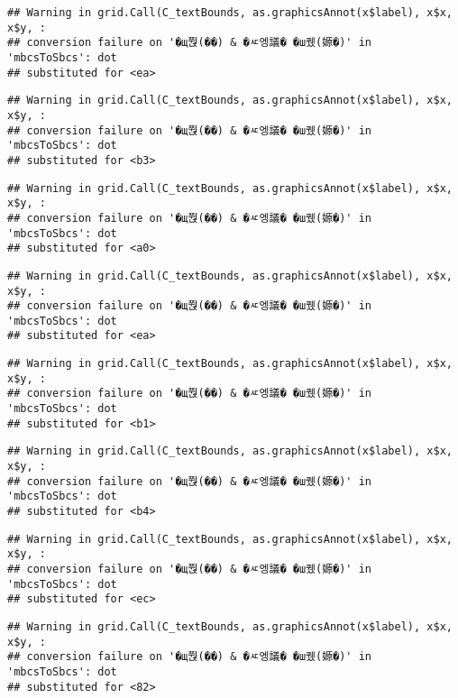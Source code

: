 \documentclass[
]{article}
\begin{document}
\begin{verbatim}
## Warning in grid.Call(C_textBounds, as.graphicsAnnot(x$label), x$x, x$y, :
## conversion failure on '�щ쭩(��) & �ㅼ엥議� �ш퀬(嫄�)' in 'mbcsToSbcs': dot
## substituted for <ea>
\end{verbatim}

\begin{verbatim}
## Warning in grid.Call(C_textBounds, as.graphicsAnnot(x$label), x$x, x$y, :
## conversion failure on '�щ쭩(��) & �ㅼ엥議� �ш퀬(嫄�)' in 'mbcsToSbcs': dot
## substituted for <b3>
\end{verbatim}

\begin{verbatim}
## Warning in grid.Call(C_textBounds, as.graphicsAnnot(x$label), x$x, x$y, :
## conversion failure on '�щ쭩(��) & �ㅼ엥議� �ш퀬(嫄�)' in 'mbcsToSbcs': dot
## substituted for <a0>
\end{verbatim}

\begin{verbatim}
## Warning in grid.Call(C_textBounds, as.graphicsAnnot(x$label), x$x, x$y, :
## conversion failure on '�щ쭩(��) & �ㅼ엥議� �ш퀬(嫄�)' in 'mbcsToSbcs': dot
## substituted for <ea>
\end{verbatim}

\begin{verbatim}
## Warning in grid.Call(C_textBounds, as.graphicsAnnot(x$label), x$x, x$y, :
## conversion failure on '�щ쭩(��) & �ㅼ엥議� �ш퀬(嫄�)' in 'mbcsToSbcs': dot
## substituted for <b1>
\end{verbatim}

\begin{verbatim}
## Warning in grid.Call(C_textBounds, as.graphicsAnnot(x$label), x$x, x$y, :
## conversion failure on '�щ쭩(��) & �ㅼ엥議� �ш퀬(嫄�)' in 'mbcsToSbcs': dot
## substituted for <b4>
\end{verbatim}

\begin{verbatim}
## Warning in grid.Call(C_textBounds, as.graphicsAnnot(x$label), x$x, x$y, :
## conversion failure on '�щ쭩(��) & �ㅼ엥議� �ш퀬(嫄�)' in 'mbcsToSbcs': dot
## substituted for <ec>
\end{verbatim}

\begin{verbatim}
## Warning in grid.Call(C_textBounds, as.graphicsAnnot(x$label), x$x, x$y, :
## conversion failure on '�щ쭩(��) & �ㅼ엥議� �ш퀬(嫄�)' in 'mbcsToSbcs': dot
## substituted for <82>
\end{verbatim}
\end{document}
